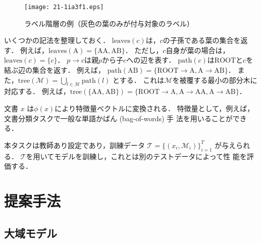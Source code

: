 \documentclass[japanese]{jnlp_1.4}
\begin{document}
\begin{figure}[b]
\begin{center}
\texttt{[image: 21-1ia3f1.eps]}
\end{center}
 \caption{ラベル階層の例（灰色の葉のみが付与対象のラベル）}
 \label{fig:tree}
\end{figure}

いくつかの記法を整理しておく．
$\mathrm{leaves}(c)$は，$c$の子孫である葉の集合を返す．
例えば，$\mathrm{leaves}(\mathrm{A})=\{\mathrm{AA},\mathrm{AB}\}$．
ただし，$c$自身が葉の場合は，$\mathrm{leaves}(c) = \{ c \}$．
$p \rightarrow c$は親$p$から子$c$への辺を表す．
$\mathrm{path}(c)$は$\mathrm{ROOT}$と$c$を結ぶ辺の集合を返す．
例えば，
$\mathrm{path}(\mathrm{AB})=\{ \mathrm{ROOT} \rightarrow \mathrm{A}, \mathrm{A} \rightarrow \mathrm{AB} \}$．
また，$\mathrm{tree}(\mathcal{M})=\bigcup_{l \in \mathcal{M}}
\mathrm{path}(l)$ とする．
これは$\mathcal{M}$を被覆する最小の部分木に対応する．
例えば，$\mathrm{tree}(\{\mathrm{AA},\mathrm{AB}\})=\{ \mathrm{ROOT} \rightarrow \mathrm{A}, \mathrm{A} \rightarrow \mathrm{AA}, \mathrm{A} \rightarrow \mathrm{AB} \}$．

文書 $x$ は$\phi(x)$により特徴量ベクトルに変換される．
特徴量として，例えば，文書分類タスクで一般な単語かばん (bag-of-words) 手
法を用いることができる．

本タスクは教師あり設定であり，訓練データ
$\mathcal{T} = \{ ( x_i, \mathcal{M}_i ) \}_{i=1}^T$
が与えられる．
$\mathcal{T}$を用いてモデルを訓練し，これとは別のテストデータによって性
能を評価する．



\section{提案手法} \label{sec:proposed}

\subsection{大域モデル} 
\end{document}
